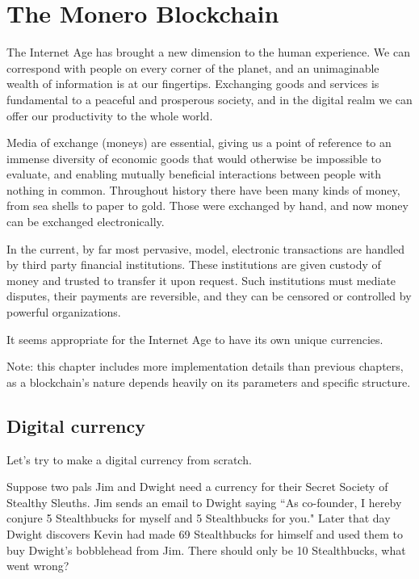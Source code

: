 \chapter{The Monero Blockchain}
\label{chapter:blockchain}

The Internet Age has brought a new dimension to the human experience. We can correspond with people on every corner of the planet, and an unimaginable wealth of information is at our fingertips. Exchanging goods and services is fundamental to a peaceful and prosperous society, and in the digital realm we can offer our productivity to the whole world.

Media of exchange (moneys) are essential, giving us a point of reference to an immense diversity of economic goods that would otherwise be impossible to evaluate, and enabling mutually beneficial interactions between people with nothing in common. Throughout history there have been many kinds of money, from sea shells to paper to gold. Those were exchanged by hand, and now money can be exchanged electronically.

In the current, by far most pervasive, model, electronic transactions are handled by third party financial institutions. These institutions are given custody of money and trusted to transfer it upon request. Such institutions must mediate disputes, their payments are reversible, and they can be censored or controlled by powerful organizations. \cite{Nakamoto_bitcoin}

It seems appropriate for the Internet Age to have its own unique currencies.

Note: this chapter includes more implementation details than previous chapters, as a blockchain's nature depends heavily on its parameters and specific structure.



\section{Digital currency}
\label{sec:digital-currency}

Let's try to make a digital currency from scratch.

Suppose two pals Jim and Dwight need a currency for their Secret Society of Stealthy Sleuths. Jim sends an email to Dwight saying ``As co-founder, I hereby conjure 5 Stealthbucks for myself and 5 Stealthbucks for you." Later that day Dwight discovers Kevin had made 69 Stealthbucks for himself and used them to buy Dwight's bobblehead from Jim. There should only be 10 Stealthbucks, what went wrong?

